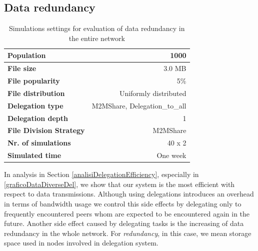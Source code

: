 \subsection{Data redundancy}
\label{analisiRidondanza}
\begin{table}[h]
\begin{center}
\begin{tabular}{|l|r|}
\hline
\bfseries Population & 1000 \\
\hline
\bfseries File size & 3.0 MB \\
\hline
\bfseries File popularity & 5\% \\
\hline
\bfseries File distribution & Uniformly distributed \\
\hline
\bfseries Delegation type & M2MShare, Delegation\_to\_all \\
\hline
\bfseries Delegation depth & 1 \\
\hline
\bfseries File Division Strategy & M2MShare \\
\hline
\bfseries Nr. of simulations & 40 x 2\\
\hline
\bfseries Simulated time & One week \\
\hline
\end{tabular}
\end{center}
\caption{Simulations settings for evaluation of data redundancy in the entire network\label{tab:settingsRedundancy}}
\end{table}

In analysis in Section \ref{analisiDelegationEfficiency}, especially in \figurename~ \ref{graficoDataDiverseDel}, we show that our system is the most efficient with respect to data transmissions. Although using delegations introduces an overhead in terms of bandwidth usage we control this side effects by delegating only to frequently encountered peers whom are expected to be encountered again in the future. Another side effect caused by delegating tasks is the increasing of data redundancy in the whole network. For \textit{redundancy}, in this case, we mean storage space used in nodes involved in delegation system. 
\\ 

